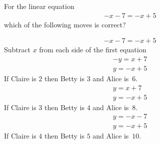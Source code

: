 \documentclass{webquiz}
\begin{document}
\begin{question} %
For the linear equation
\begin{gather*} 
-x-7=-x+5
\end{gather*}
which of the following moves is correct?
\begin{choice}[columns=2] %
\correct
\begin{gather*} 
-x-7=-x+5
\end{gather*}
\feedback Subtract $x$ from each side of the first equation
\incorrect
\begin{gather*} 
-y=x+7\\
y=-x+5
\end{gather*}
\feedback If Claire is $2$ then Betty is $3$ and Alice is~$6$.
\incorrect
\begin{gather*} 
y=x+7\\
y=-x+5
\end{gather*}
\feedback If Claire is $3$ then Betty is $4$ and Alice is~$8$.
\incorrect
\begin{gather*} 
y=-x-7\\
y=-x+5
\end{gather*}
\feedback If Claire is $4$ then Betty is $5$ and Alice is~$10$.
\end{choice}
\end{question}
\end{document}

